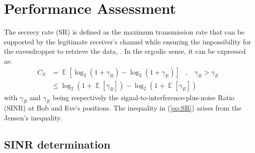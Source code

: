 \documentclass[a4paper,11pt]{article}
\begin{document}

\section{Performance Assessment}
\label{sec:perf}
The secrecy rate (SR) is defined as the maximum transmission rate that can be supported by the legitimate receiver's channel while ensuring the impossibility for the eavesdropper to retrieve the data, \cite{TR_Tran_secrecy_capa}. In the ergodic sense, it can be expressed as:
\begin{equation}
\begin{split}
    C_S &=  \mathop{\mathbb{E}} \left[\log_2{\left(1+\gamma_B\right)} - \log_2{\left(1+\gamma_E\right)}\right] \; \; \; , \; \; \;  \gamma_B > \gamma_E \\
    &\leq   \log_2 \left( 1+ \mathop{\mathbb{E}}\left[\gamma_B\right] \right) - \log_2 \left( 1+ \mathop{\mathbb{E}}\left[\gamma_E \right] \right) 
    \end{split}
    \label{eq:SR}
\end{equation}
with $\gamma_B$ and $\gamma_E$ being respectively the signal-to-interference-plus-noise Ratio (SINR) at Bob and Eve's positions. The inequality in (\ref{eq:SR}) arises from the Jensen's inequality. 


\subsection{SINR determination}
\end{document}
